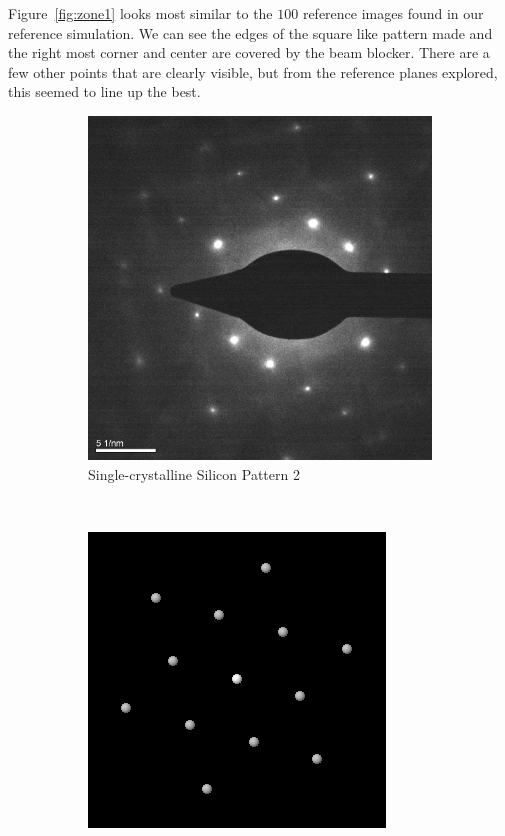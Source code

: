 \documentclass[12pt,a4paper]{article}
\begin{document}
Figure~\ref{fig:zone1} looks most similar to the $1 0 0$ reference images found in our reference simulation\cite{viz}.  We can see the edges of the square like pattern made and the right most corner and center are covered by the beam blocker.    There are a few other points that are clearly visible, but from the reference planes explored, this seemed to line up the best.

\begin{figure}[htbp]
  \centering
  \begin{subfigure}[b]{0.45\textwidth}
    \includegraphics[width=\textwidth]{data/Image4 Si_Diff_Zone2.png}
    \caption{Single-crystalline Silicon Pattern 2}
    \label{fig:si2}
  \end{subfigure}
  ~
  \begin{subfigure}[b]{0.45\textwidth}
    \includegraphics[width=\textwidth]{data/111.png}

\end{subfigure}
\end{figure}
\end{document}
